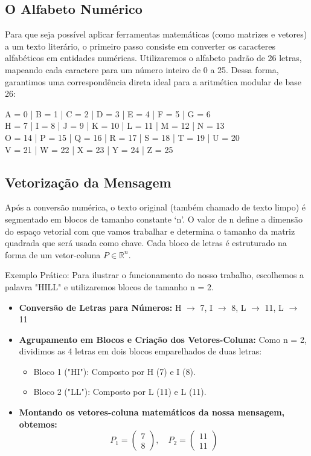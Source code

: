 \documentclass[a4paper,12pt,twocolumn]{article}
\begin{document}
\subsection{O Alfabeto Numérico}
Para que seja possível aplicar ferramentas matemáticas (como matrizes e vetores) a um texto literário, o primeiro passo consiste em converter os caracteres alfabéticos em entidades numéricas. Utilizaremos o alfabeto padrão de 26 letras, mapeando cada caractere para um número inteiro de 0 a 25. Dessa forma, garantimos uma correspondência direta ideal para a aritmética modular de base 26:

\begin{center}
A = 0 | B = 1 | C = 2 | D = 3 | E = 4 | F = 5 | G = 6 \\
H = 7 | I = 8 | J = 9 | K = 10 | L = 11 | M = 12 | N = 13 \\
O = 14 | P = 15 | Q = 16 | R = 17 | S = 18 | T = 19 | U = 20 \\
V = 21 | W = 22 | X = 23 | Y = 24 | Z = 25
\end{center}

\subsection{Vetorização da Mensagem}
Após a conversão numérica, o texto original (também chamado de texto limpo) é segmentado em blocos de tamanho constante `n'. O valor de n define a dimensão do espaço vetorial com que vamos trabalhar e determina o tamanho da matriz quadrada que será usada como chave. Cada bloco de letras é estruturado na forma de um vetor-coluna $P \in \mathbb{R}^n$.

Exemplo Prático: Para ilustrar o funcionamento do nosso trabalho, escolhemos a palavra "HILL" e utilizaremos blocos de tamanho n = 2.

\begin{itemize}
    \item \textbf{Conversão de Letras para Números:} H $\rightarrow$ 7, I $\rightarrow$ 8, L $\rightarrow$ 11, L $\rightarrow$ 11
    \item \textbf{Agrupamento em Blocos e Criação dos Vetores-Coluna:} Como n = 2, dividimos as 4 letras em dois blocos emparelhados de duas letras:
    \begin{itemize}
        \item Bloco 1 ("HI"): Composto por H (7) e I (8).
        \item Bloco 2 ("LL"): Composto por L (11) e L (11).
    \end{itemize}
    \item \textbf{Montando os vetores-coluna matemáticos da nossa mensagem, obtemos:}
    \begin{equation}
        P_1 = \begin{pmatrix} 7 \\ 8 \end{pmatrix}, \quad P_2 = \begin{pmatrix} 11 \\ 11 \end{pmatrix}
    \end{equation}
\end{itemize}
\end{document}
